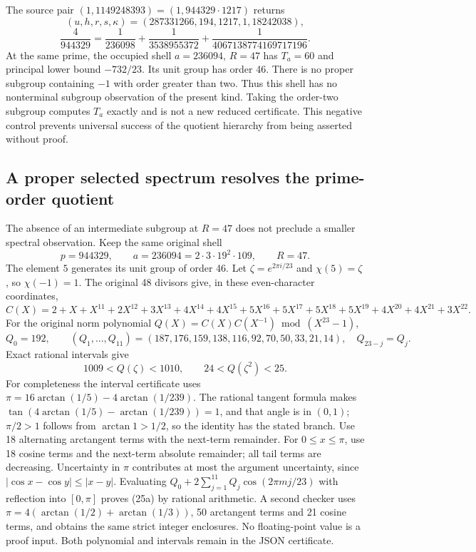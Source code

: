 The source pair $(1,1149248393)=(1,944329\cdot1217)$ returns
\[
 (u,h,r,s,\kappa)=(287331266,194,1217,1,18242038),
\]
\[
 \frac4{944329}=\frac1{236098}+\frac1{3538955372}
               +\frac1{4067138774169717196}.
\]
At the same prime, the occupied shell $a=236094$, $R=47$ has $T_a=60$ and
principal lower bound $-732/23$. Its unit group has order 46. There is no proper
subgroup containing $-1$ with order greater than two. Thus this shell has no
nonterminal subgroup observation of the present kind. Taking the order-two
subgroup computes $T_a$ exactly and is not a new reduced certificate. This
negative control prevents universal success of the quotient hierarchy from
being asserted without proof.

\subsection{A proper selected spectrum resolves the prime-order quotient}
The absence of an intermediate subgroup at $R=47$ does not preclude a smaller
spectral observation. Keep the same original shell
\[
 p=944329,\qquad a=236094=2\cdot3\cdot19^2\cdot109,\qquad R=47.
\]
The element $5$ generates its unit group of order 46. Let
$\zeta=e^{2\pi i/23}$ and $\chi(5)=\zeta$, so $\chi(-1)=1$.
The original 48 divisors give, in these even-character coordinates,
\[
 C(X)=2+X+X^{11}+2X^{12}+3X^{13}+4X^{14}+4X^{15}
       +5X^{16}+5X^{17}+5X^{18}+5X^{19}+4X^{20}+4X^{21}+3X^{22}.
\]
For the original norm polynomial $Q(X)=C(X)C(X^{-1})\bmod(X^{23}-1)$,
\[
 Q_0=192,\qquad
 (Q_1,\ldots,Q_{11})=(187,176,159,138,116,92,70, 50,33,21,14),
 \quad Q_{23-j}=Q_j.
\]
Exact rational intervals give
\[
 \boxed{1009<Q(\zeta)<1010,\qquad24<Q(\zeta^2)<25.}       \tag{25a}
\]
For completeness the interval certificate uses
$\pi=16\arctan(1/5)-4\arctan(1/239)$. The rational tangent formula makes
$\tan(4\arctan(1/5)-\arctan(1/239))=1$, and that angle is in $(0,1)$;
$\pi/2>1$ follows from $\arctan1>1/2$, so the identity has the stated branch.
Use 18 alternating arctangent terms with the next-term remainder. For
$0\le x\le\pi$, use 18 cosine terms and the next-term absolute remainder;
all tail terms are decreasing. Uncertainty in $\pi$ contributes at most the
argument uncertainty, since $|\cos x-\cos y|\le|x-y|$. Evaluating
$Q_0+2\sum_{j=1}^{11}Q_j\cos(2\pi mj/23)$ with reflection into $[0,\pi]$
proves (25a) by rational arithmetic. A second checker uses
$\pi=4(\arctan(1/2)+\arctan(1/3))$, 50 arctangent terms and 21 cosine terms,
and obtains the same strict integer enclosures. No floating-point value is a
proof input. Both polynomial and intervals remain in the JSON certificate.

